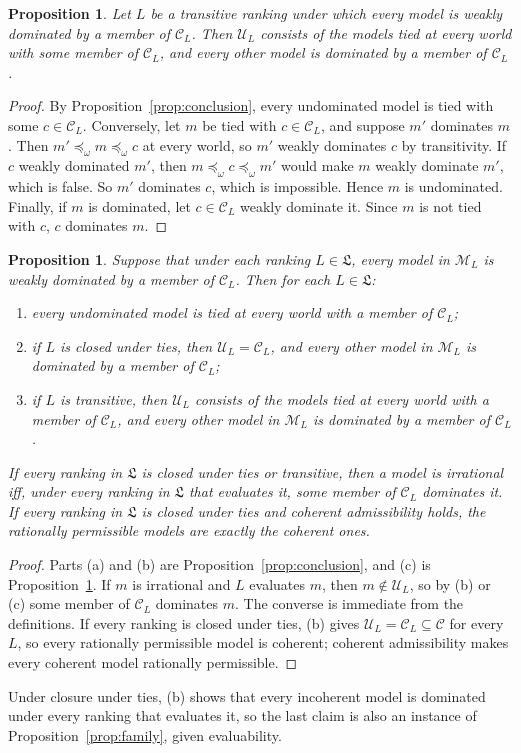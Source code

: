 \documentclass[11pt]{article}
\newtheorem{proposition}[theorem]{Proposition}
\theoremstyle{definition}
\newcommand{\M}{\mathcal M}
\newcommand{\C}{\mathcal C}
\newcommand{\U}{\mathcal U}
\newcommand{\Lf}{\mathfrak L}
\begin{document}
\begin{proposition}\label{prop:profiles}
Let $L$ be a transitive ranking under which every model is weakly dominated by a member of $\C_L$. Then $\U_L$ consists of the models tied at every world with some member of $\C_L$, and every other model is dominated by a member of $\C_L$.
\end{proposition}
\begin{proof}
By Proposition~\ref{prop:conclusion}, every undominated model is tied with some $c\in\C_L$. Conversely, let $m$ be tied with $c\in\C_L$, and suppose $m'$ dominates $m$. Then $m'\preceq_\omega m\preceq_\omega c$ at every world, so $m'$ weakly dominates $c$ by transitivity. If $c$ weakly dominated $m'$, then $m\preceq_\omega c\preceq_\omega m'$ would make $m$ weakly dominate $m'$, which is false. So $m'$ dominates $c$, which is impossible. Hence $m$ is undominated. Finally, if $m$ is dominated, let $c\in\C_L$ weakly dominate it. Since $m$ is not tied with $c$, $c$ dominates $m$.
\end{proof}

\begin{proposition}\label{prop:permissible}
Suppose that under each ranking $L\in\Lf$, every model in $\M_L$ is weakly dominated by a member of $\C_L$. Then for each $L\in\Lf$:
\begin{enumerate}[label=(\alph*)]
\item every undominated model is tied at every world with a member of $\C_L$;
\item if $L$ is closed under ties, then $\U_L=\C_L$, and every other model in $\M_L$ is dominated by a member of $\C_L$;
\item if $L$ is transitive, then $\U_L$ consists of the models tied at every world with a member of $\C_L$, and every other model in $\M_L$ is dominated by a member of $\C_L$.
\end{enumerate}
If every ranking in $\Lf$ is closed under ties or transitive, then a model is irrational iff, under every ranking in $\Lf$ that evaluates it, some member of $\C_L$ dominates it. If every ranking in $\Lf$ is closed under ties and coherent admissibility holds, the rationally permissible models are exactly the coherent ones.
\end{proposition}
\begin{proof}
Parts (a) and (b) are Proposition~\ref{prop:conclusion}, and (c) is Proposition~\ref{prop:profiles}. If $m$ is irrational and $L$ evaluates $m$, then $m\notin\U_L$, so by (b) or (c) some member of $\C_L$ dominates $m$. The converse is immediate from the definitions. If every ranking is closed under ties, (b) gives $\U_L=\C_L\subseteq\C$ for every $L$, so every rationally permissible model is coherent; coherent admissibility makes every coherent model rationally permissible.
\end{proof}
Under closure under ties, (b) shows that every incoherent model is dominated under every ranking that evaluates it, so the last claim is also an instance of Proposition~\ref{prop:family}, given evaluability.
\end{document}

